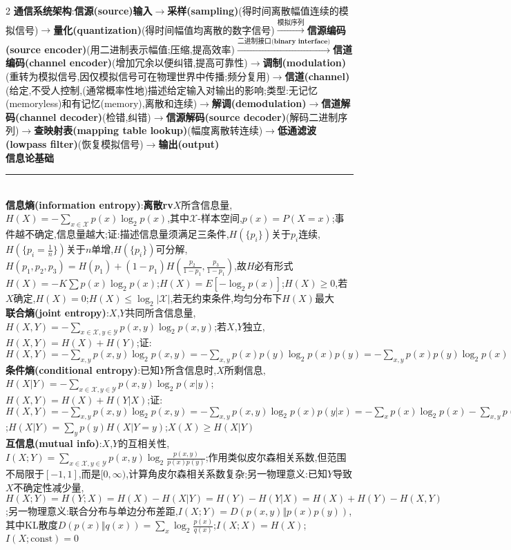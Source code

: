 \documentclass[UTF8,a4paper,10pt]{article}
\providecommand{\abs}[1]{\left\lvert#1\right\rvert}
\begin{document}
\scriptsize
\begin{multicols*}{2}
\noindent\textbf{通信系统架构}:\textbf{信源(source)输入}$\rightarrow$\textbf{采样(sampling)}(得时间离散幅值连续的模拟信号)$\rightarrow$\textbf{量化(quantization)}(得时间幅值均离散的数字信号)$\overset{\textbf{模拟序列}}{\longrightarrow}$\textbf{信源编码(source encoder)}(用二进制表示幅值;压缩,提高效率)$\overset{\textbf{二进制接口(binary interface)}}{\longrightarrow}$\textbf{信道编码(channel encoder)}(增加冗余以便纠错,提高可靠性)$\rightarrow$\textbf{调制(modulation)}(重转为模拟信号,因仅模拟信号可在物理世界中传播;频分复用)$\rightarrow$\textbf{信道(channel)}(给定,不受人控制,(通常概率性地)描述给定输入对输出的影响;类型:无记忆(memoryless)和有记忆(memory),离散和连续)$\rightarrow$\textbf{解调(demodulation)}$\rightarrow$\textbf{信道解码(channel decoder)}(检错,纠错)$\rightarrow$\textbf{信源解码(source decoder)}(解码二进制序列)$\rightarrow$\textbf{查映射表(mapping table lookup)}(幅度离散转连续)$\rightarrow$\textbf{低通滤波(lowpass filter)}(恢复模拟信号)$\rightarrow$\textbf{输出(output)}\\
\textbf{信息论基础}\rule{\columnwidth-}{.2pt}\\
\textbf{信息熵(information entropy)}:\textbf{离散rv}$X$所含信息量,$H(X)=-\sum_{x\in\mathcal{X}}p(x)\log_2p(x)$,其中$\mathcal{X}$-样本空间,$p(x)=P(X=x)$;事件越不确定,信息量越大;证:描述信息量须满足三条件,$H(\{p_i\})$关于$p_i$连续,$H(\{p_i=\frac{1}{n}\})$关于$n$单增,$H(\{p_i\})$可分解,$H(p_1,p_2,p_3)=H(p_1)+(1-p_1)H(\frac{p_2}{1-p_1},\frac{p_3}{1-p_1})$,故$H$必有形式$H(X)=-K\sum p(x)\log_2p(x)$;$H(X)=E[-\log_2p(x)]$;$H(X)\geq 0$,若$X$确定,$H(X)=0$;$H(X)\leq\log_2\abs{\mathcal{X}}$,若无约束条件,均匀分布下$H(X)$最大\\
\textbf{联合熵(joint entropy)}:$X$,$Y$共同所含信息量,$H(X,Y)=-\sum_{x\in\mathcal{X},y\in\mathcal{Y}}p(x,y)\log_2p(x,y)$;若$X$,$Y$独立,$H(X,Y)=H(X)+H(Y)$;证:$H(X,Y)=-\sum_{x,y}p(x,y)\log_2p(x,y)=-\sum_{x,y}p(x)p(y)\log_2p(x)p(y)=-\sum_{x,y}p(x)p(y)\log_2p(x)-\sum_{x,y}p(x)p(y)\log_2p(y)=-\sum_xp(x)\log_2p(x)-\sum_yp(y)\log_2p(y)=H(X)+H(Y)$\\
\textbf{条件熵(conditional entropy)}:已知$Y$所含信息时,$X$所剩信息,$H(X\vert Y)=-\sum_{x\in\mathcal{X},y\in\mathcal{Y}}p(x,y)\log_2p(x\vert y)$;$H(X,Y)=H(X)+H(Y\vert X)$;证:$H(X,Y)=-\sum_{x,y}p(x,y)\log_2p(x,y)=-\sum_{x,y}p(x,y)\log_2p(x)p(y\vert x)=-\sum_xp(x)\log_2p(x)-\sum_{x,y}p(x,y)\log_2p(y\vert x)=H(X)+H(Y\vert X)$;$H(X\vert Y)=\sum_yp(y)H(X\vert Y=y)$;$X(X)\geq H(X\vert Y)$\\
\textbf{互信息(mutual info)}:$X$,$Y$的互相关性,$I(X;Y)=\sum_{x\in\mathcal{X},y\in\mathcal{Y}}p(x,y)\log_2\frac{p(x,y)}{p(x)p(y)}$;作用类似皮尔森相关系数,但范围不局限于$[-1,1]$,而是$[0,\infty)$,计算角皮尔森相关系数复杂;另一物理意义:已知$Y$导致$X$不确定性减少量,$H(X;Y)=H(Y;X)=H(X)-H(X\vert Y)=H(Y)-H(Y\vert X)=H(X)+H(Y)-H(X,Y)$;另一物理意义:联合分布与单边分布差距,$I(X;Y)=D(p(x,y)\Vert p(x)p(y))$,其中KL散度$D(p(x)\Vert q(x))=\sum_x\log_2\frac{p(x)}{q(x)}$;$I(X;X)=H(X)$;$I(X;\text{const})=0$\\

\end{multicols*}
\end{document}
